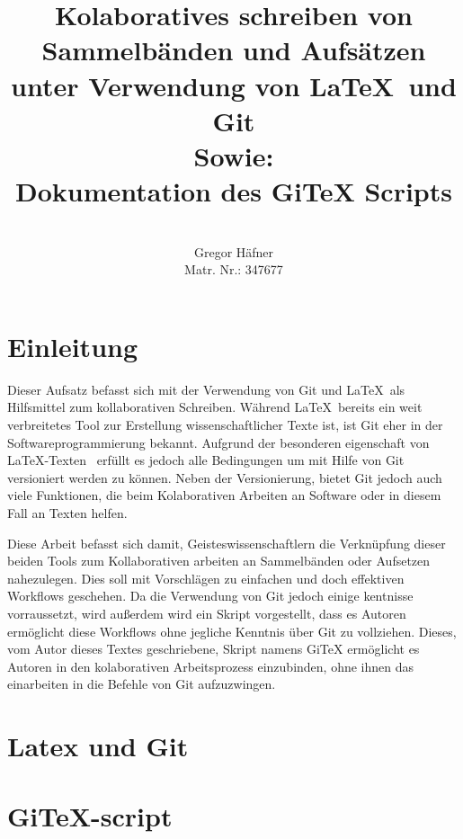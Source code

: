 \documentclass[12pt,a4paper]{scrartcl}
\author{\\ Gregor Häfner \\
{\small Matr. Nr.: 347677} }
\title{Kolaboratives schreiben von Sammelbänden und Aufsätzen unter Verwendung von \LaTeX ~und Git \bigskip \\ Sowie: \\ Dokumentation des GiTeX Scripts}
\begin{document}
\begin{titlepage}
 
\maketitle
\bigskip
\tableofcontents
\pagebreak
 
\end{titlepage}


\section{Einleitung}

Dieser Aufsatz befasst sich mit der Verwendung von Git und \LaTeX \ als Hilfsmittel zum kollaborativen Schreiben. Während \LaTeX \ bereits ein weit verbreitetes Tool zur Erstellung wissenschaftlicher Texte ist, ist Git eher in der Softwareprogrammierung bekannt. Aufgrund der besonderen eigenschaft von \LaTeX -Texten \ erfüllt es jedoch alle Bedingungen um mit Hilfe von Git versioniert werden zu können. Neben der Versionierung, bietet Git jedoch auch viele Funktionen, die beim Kolaborativen Arbeiten an Software oder in diesem Fall an Texten helfen.

 Diese Arbeit befasst sich damit, Geisteswissenschaftlern die Verknüpfung dieser beiden Tools zum Kollaborativen arbeiten an Sammelbänden oder Aufsetzen nahezulegen. Dies soll mit Vorschlägen zu einfachen und doch effektiven Workflows geschehen. Da die Verwendung von Git jedoch einige kentnisse vorraussetzt, wird außerdem wird ein Skript vorgestellt, dass es Autoren ermöglicht diese Workflows ohne jegliche Kenntnis über Git zu vollziehen. Dieses, vom Autor dieses Textes geschriebene, Skript namens GiTeX ermöglicht es Autoren in den kolaborativen Arbeitsprozess einzubinden, ohne ihnen das einarbeiten in die Befehle von Git aufzuzwingen.

\section{Latex und Git}



\section{GiTeX-script}
\end{document}
